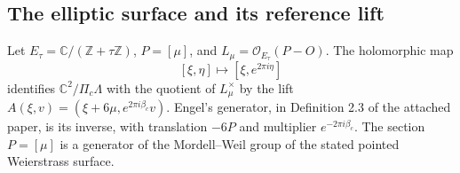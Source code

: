 \subsection{The elliptic surface and its reference lift}
\begin{proposition}[FAM B.1.1; T]\label{fam:B.1.1}
Let $E_\tau=\mathbb C/(\mathbb Z+\tau\mathbb Z)$, $P=[\mu]$, and $L_\mu=\mathcal O_{E_\tau}(P-O)$. The holomorphic map
\[
 [\xi,\eta]\longmapsto[\xi,e^{2\pi i\eta}]
\]
identifies $\mathbb C^2/\Pi_c\Lambda$ with the quotient of $L_\mu^\times$ by the lift
$A(\xi,v)=(\xi+6\mu,e^{2\pi i\beta_c}v)$. Engel's generator, in Definition 2.3 of the attached paper, is its inverse, with translation $-6P$ and multiplier $e^{-2\pi i\beta_c}$. The section $P=[\mu]$ is a generator of the Mordell--Weil group of the stated pointed Weierstrass surface.
\end{proposition}
